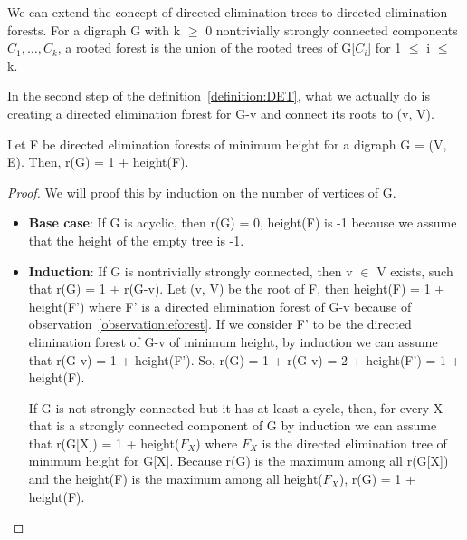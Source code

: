 We can extend the concept of directed elimination trees to directed elimination forests. For a digraph G with k $\geq$ 0 nontrivially strongly connected components $C_1, \ldots, C_k$, a rooted forest is the union of the rooted trees of G[$C_i$] for 1 $\leq$ i $\leq$ k.

\begin{observation}
In the second step of the definition~\ref{definition:DET}, what we actually do is creating a directed elimination forest for G-v and connect its roots to (v, V).
\label{observation:eforest}
\end{observation}

\begin{lemma}
Let F be directed elimination forests of minimum height for a digraph G = (V, E). Then, r(G) = 1 + height(F). 
\end{lemma}
\begin{proof}
We will proof this by induction on the number of vertices of G.
\begin{itemize}
  \item \textbf{Base case}: If G is acyclic, then r(G) = 0, height(F) is -1 because we assume that the height of the empty tree is -1.
  \item \textbf{Induction}: If G is nontrivially strongly connected, then v $\in$ V exists, such that r(G) = 1 + r(G-v). Let (v, V) be the root of F, then height(F) = 1 + height(F') where F' is a directed elimination forest of G-v because of observation~\ref{observation:eforest}. If we consider F' to be the directed elimination forest of G-v of minimum height, by induction we can assume that r(G-v) = 1 + height(F'). So, r(G) = 1 + r(G-v) = 2 + height(F') = 1 + height(F).
  
  If G is not strongly connected but it has at least a cycle, then, for every X that is a strongly connected component of G by induction we can assume that r(G[X]) = 1 + height($F_X$) where $F_X$ is the directed elimination tree of minimum height for G[X]. Because r(G) is the maximum among all r(G[X]) and the height(F) is the maximum among all height($F_X$), r(G) = 1 + height(F).
\end{itemize}
\end{proof}